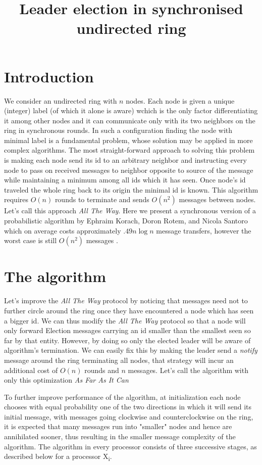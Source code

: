 \documentclass[a4paper,12pt]{article}
\title{Leader election in synchronised undirected ring}
\date{}
\begin{document}
\maketitle
\section{Introduction}
We consider an undirected ring with $n$ nodes. Each node is given a unique (integer) label (of which it alone is aware) wchich is the only factor differentiating it among other nodes and it can communicate only with its two neighbors on the ring in synchronous rounds. In such a configuration finding the node with minimal label is a fundamental problem, whose solution may be applied in more complex algorithms.
The most straight-forward approach to solving this problem is making each node send its id to an arbitrary neighbor and instructing every node to pass on received messages to neighbor opposite to source of the message while maintaining a minimum among all ids which it has seen. Once node's id traveled the whole ring back to its origin the minimal id is known. This algorithm requires $O(n)$ rounds to terminate and sends $O(n^2)$ messages between nodes. Let's call this approach \textit{All The Way}. Here we present a synchronous version of a probabilistic algorithm by Ephraim Korach, Doron Rotem, and Nicola Santoro \cite{ROTEM1987575} which on average costs approximately $.49n \log n$ message transfers, however the worst case is still $O(n^2)$ messages .

\section{The algorithm}
Let's improve the \textit{All The Way} protocol by noticing that messages need not to further circle around the ring once they have encountered a node which has seen a bigger id. We can thus modify the \textit{All The Way} protocol so that a node will only forward Election messages carrying an id smaller than the smallest seen so far by that entity. However, by doing so only the elected leader will be aware of algorithm's termination. We can easily fix this by making the leader send a \textit{notify} message around the ring terminating all nodes, that strategy will incur an additional cost of $O(n)$ rounds and $n$ messages. Let's call the algorithm with only this optimization \textit{As Far As It Can}

To further improve performance of the algorithm, at initialization each node chooses with equal probability one of the two directions in which it will send its initial message, with messages going clockwise and counterclockwise on the ring, it is expected that many messages run into "smaller" nodes and hence are annihilated sooner, thus resulting in the smaller message complexity of the algorithm. The algorithm in every processor consists of three successive stages, as described below for a processor X\textsubscript{i}.
\end{document}
